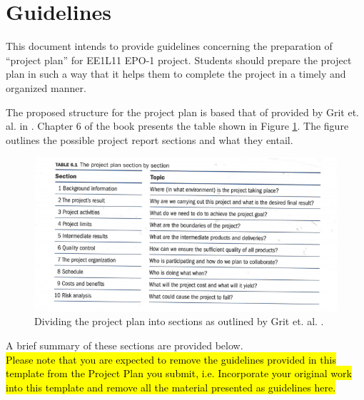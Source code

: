 \chapter*{Guidelines}

This document intends to provide guidelines concerning the preparation of “project plan” for EE1L11 EPO-1 project. Students should prepare the project plan in such a  way that it helps them to complete the project in a timely and organized manner.\par 
The proposed structure for the project plan is based that of provided by Grit et. al. in \cite{Grit}. Chapter 6 of the book presents the table shown in Figure \ref{table}. The figure outlines the  possible project report sections and what they entail.
\begin{figure}[h]
\centering
\includegraphics[width=14cm]{table.png}
\caption{\centering Dividing the project plan into sections as outlined by Grit et. al. \cite{Grit}.}
\label{table}
\end{figure} 
A brief summary of these sections are provided below.\\

\hl{Please note that you are expected to remove the guidelines provided in this template from the  Project Plan you submit, i.e. Incorporate your original work into this template and remove all the material presented as guidelines here. }